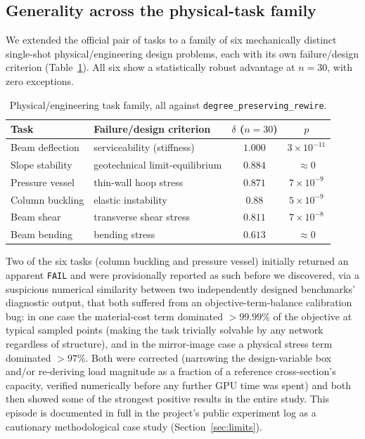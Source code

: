 \documentclass[11pt]{article}
\begin{document}
\subsection{Generality across the physical-task family}
\label{sec:generality}

We extended the official pair of tasks to a family of six mechanically
distinct single-shot physical/engineering design problems, each with its
own failure/design criterion (Table~\ref{tab:physical}). All six show a
statistically robust advantage at $n=30$, with zero exceptions.

\begin{table}[h]
\centering
\caption{Physical/engineering task family, all against
\texttt{degree\_preserving\_rewire}.}
\label{tab:physical}
\begin{tabular}{llcc}
\toprule
Task & Failure/design criterion & $\delta$ ($n{=}30$) & $p$ \\
\midrule
Beam deflection & serviceability (stiffness) & $1.000$ & $3\times10^{-11}$ \\
Slope stability & geotechnical limit-equilibrium & $0.884$ & $\approx 0$ \\
Pressure vessel & thin-wall hoop stress & $0.871$ & $7\times10^{-9}$ \\
Column buckling & elastic instability & $0.88$ & $5\times10^{-9}$ \\
Beam shear & transverse shear stress & $0.811$ & $7\times10^{-8}$ \\
Beam bending & bending stress & $0.613$ & $\approx 0$ \\
\bottomrule
\end{tabular}
\end{table}

Two of the six tasks (column buckling and pressure vessel) initially
returned an apparent \texttt{FAIL} and were provisionally reported as
such before we discovered, via a suspicious numerical similarity between
two independently designed benchmarks' diagnostic output, that both
suffered from an objective-term-balance calibration bug: in one case the
material-cost term dominated $>99.99\%$ of the objective at typical
sampled points (making the task trivially solvable by any network
regardless of structure), and in the mirror-image case a physical stress
term dominated $>97\%$. Both were corrected (narrowing the design-variable
box and/or re-deriving load magnitude as a fraction of a reference
cross-section's capacity, verified numerically before any further GPU
time was spent) and both then showed some of the strongest positive
results in the entire study. This episode is documented in full in the
project's public experiment log as a cautionary methodological case study
(Section~\ref{sec:limits}).
\end{document}
